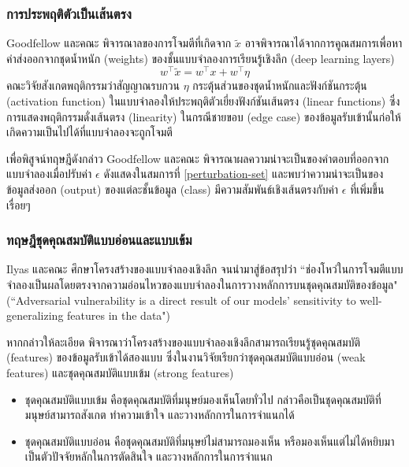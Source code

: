 \documentclass{cpepaper}
\begin{document}
\subsubsection{การประพฤติตัวเป็นเส้นตรง}
Goodfellow และคณะ พิจารณาลของการโจมตีที่เกิดจาก $\tilde{x}$ อาจพิจารณาได้จากการคูณสมการเพื่อหาค่าส่งออกจากชุดน้ำหนัก (weights) ของชั้นแบบจำลองการเรียนรู้เชิงลึก (deep learning layers) 
\begin{equation}
    w^\top\tilde{x} = w^\top x + w^\top \eta
\end{equation}
คณะวิจัยสังเกตพฤติกรรมว่าสัญญาณรบกวน $\eta$ กระตุ้นส่วนของชุดน้ำหนักและฟังก์ชันกระตุ้น (activation function) ในแบบจำลองให้ประพฤติตัวเยี่ยงฟังก์ชันเส้นตรง (linear functions) ซึ่งการแสดงพฤติกรรมดั่งเส้นตรง (linearity) ในกรณีชายขอบ (edge case) ของข้อมูลรับเข้านั้นก่อให้เกิดความเป็นไปได้ที่แบบจำลองจะถูกโจมตี

เพื่อพิสูจน์ทฤษฎีดังกล่าว Goodfellow และคณะ พิจารณาผลความน่าจะเป็นของคำตอบที่ออกจากแบบจำลองเมื่อปรับค่า $\epsilon$ ดังแสดงในสมการที่ \ref{perturbation-set} และพบว่าความน่าจะเป็นของข้อมูลส่งออก (output) ของแต่ละชั้นข้อมูล (class) มีความสัมพันธ์เชิงเส้นตรงกับค่า $\epsilon$ ที่เพิ่มขึ้นเรื่อยๆ

\subsubsection{ทฤษฎีชุดคุณสมบัติแบบอ่อนและแบบเข้ม}

Ilyas และคณะ ศึกษาโครงสร้างของแบบจำลองเชิงลึก จนนำมาสู่ข้อสรุปว่า ``ช่องโหว่ในการโจมตีแบบจำลองเป็นผลโดยตรงจากความอ่อนไหวของแบบจำลองในการวางหลักการบนชุดคุณสมบัติของข้อมูล" (``Adversarial vulnerability is a direct result of our models’ sensitivity to well-generalizing features in the data")

หากกล่าวให้ละเอียด พิจารณาว่าโครงสร้างของแบบจำลองเชิงลึกสามารถเรียนรู้ชุดคุณสมบัติ (features) ของข้อมูลรับเข้าได้สองแบบ ซึ่งในงานวิจัยเรียกว่าชุดคุณสมบัติแบบอ่อน (weak features) และชุดคุณสมบัติแบบเข้ม (strong features)
\begin{itemize}
    \item ชุดคุณสมบัติแบบเข้ม คือชุดคุณสมบัติที่มนุษย์มองเห็นโดยทั่วไป กล่าวคือเป็นชุดคุณสมบัติที่มนุษย์สามารถสังเกต ทำความเข้าใจ และวางหลักการในการจำแนกได้
    \item ชุดคุณสมบัติแบบอ่อน คือชุดคุณสมบัติที่มนุษย์ไม่สามารถมองเห็น หรือมองเห็นแต่ไม่ได้หยิบมาเป็นตัวปัจจัยหลักในการตัดสินใจ และวางหลักการในการจำแนก
\end{itemize}
\end{document}
